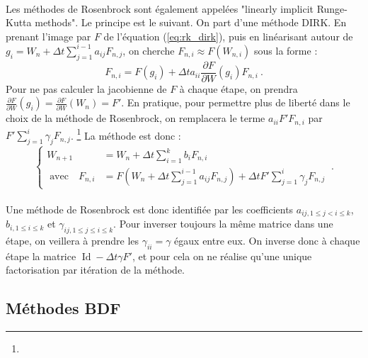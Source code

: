       \paragraph{}
      Les méthodes de Rosenbrock sont également appelées "linearly implicit Runge-Kutta methods".
      Le principe est le suivant.
      On part d'une méthode DIRK.
      En prenant l'image par $F$ de l'équation (\ref{eq:rk_dirk}), puis en linéarisant autour de $g_i = W_n + \Delta t\sum_{j = 1}^{i-1}a_{ij}F_{n,j}$, on cherche $F_{n,i} \approx F\left(W_{n,i}\right)$ sous la forme :
      \[F_{n,i} = F\left(g_i\right) + \Delta ta_{ii}\frac{\partial F}{\partial W}\left(g_i\right)F_{n,i}\ .\]
      Pour ne pas calculer la jacobienne de $F$ à chaque étape, on prendra $\frac{\partial F}{\partial W}\left(g_i\right) = \frac{\partial F}{\partial W}\left(W_n\right) = F'$.
      En pratique, pour permettre plus de liberté dans le choix de la méthode de Rosenbrock, on remplacera le terme $a_{ii}F'F_{n,i}$ par $F'\sum_{j=1}^i\gamma_jF_{n,j}$.
      \footnote{}
      La méthode est donc :
      \begin{equation}\label{eq:rk_rosenbrock}
        \left\{\begin{aligned}
          W_{n+1} &= W_n + \Delta t\sum_{i = 1}^kb_iF_{n,i} \\
          \;\textrm{avec}\quad F_{n,i} &= F\left(W_n + \Delta t\sum_{j = 1}^{i-1}a_{ij}F_{n,j}\right) + \Delta tF'\sum_{j=1}^i\gamma_jF_{n,j}
        \end{aligned}\right.\ .
      \end{equation}

      \paragraph{}
      Une méthode de Rosenbrock est donc identifiée par les coefficients $a_{ij, 1\leq j<i\leq k}$, $b_{i, 1\leq i\leq k}$ et $\gamma_{ij, 1\leq j\leq i\leq k}$.
      Pour inverser toujours la même matrice dans une étape, on veillera à prendre les $\gamma_{ii} = \gamma$ égaux entre eux.
      On inverse donc à chaque étape la matrice $\operatorname{Id} - \Delta t\gamma F'$, et pour cela on ne réalise qu'une unique factorisation par itération de la méthode.


  \subsection{Méthodes BDF}


